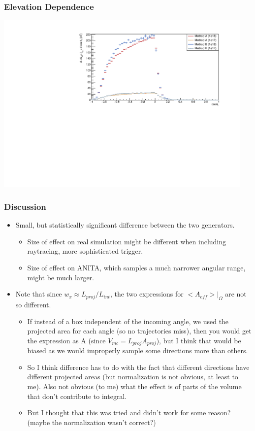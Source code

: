 \documentclass[hyperref={pdfpagelabels=false},aspectratio=169]{beamer} \mode<presentation> { \usetheme{Boadilla} }
\begin{document}
\begin{frame}
  \frametitle{Elevation Dependence} 
  \centering
  \includegraphics[width=5in]{theta18}

\end{frame} 


\begin{frame}
  \frametitle{Discussion}
  \begin{itemize}
    \item Small, but statistically significant difference between the two generators. 
      \begin{itemize} 
       \item Size of effect on real simulation might be different when including raytracing, more sophisticated trigger.
       \item Size of effect on ANITA, which samples a much narrower angular range, might be much larger. 
     \end{itemize} 
    \item Note that since $w_{x} \approx  L_{proj} /L_{int}$, the two expressions for $<A_{eff}>|_{\Omega}$ are not so different. 
    \begin{itemize} 
      \item If instead of a box independent of the incoming angle, we used the projected area for each angle (so no trajectories miss), then you would get the expression as A (since $V_{mc} = L_{proj} A_{proj}$), but  I think that would be biased as we would improperly sample some directions more than others.
      \item So I think difference has to do with the fact that different directions have different projected areas (but normalization is not obvious, at least to me). Also not obvious (to me) what the effect is of parts of the volume that don't contribute to integral. 
        \item But I thought that this was tried and didn't work for some reason? (maybe the normalization wasn't correct?) 
    \end{itemize}
\end{itemize} 
\end{frame}
\end{document}

